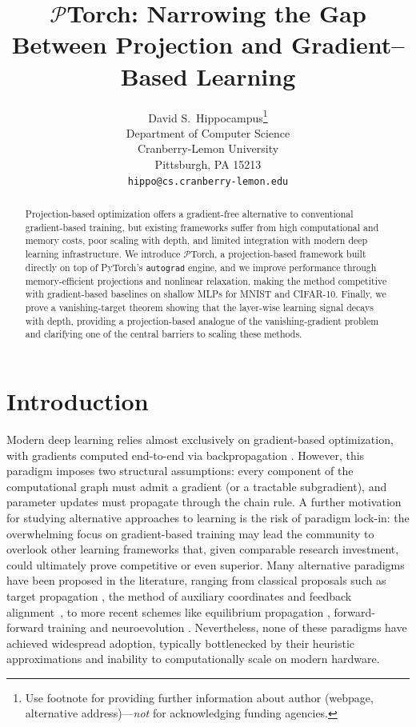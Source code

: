 \documentclass{article}
\title{$\mathcal{P}$Torch: Narrowing the Gap Between Projection and Gradient--Based Learning}
\author{%
  David S.~Hippocampus\thanks{Use footnote for providing further information
    about author (webpage, alternative address)---\emph{not} for acknowledging
    funding agencies.} \\
  Department of Computer Science\\
  Cranberry-Lemon University\\
  Pittsburgh, PA 15213 \\
  \texttt{hippo@cs.cranberry-lemon.edu} \\
}
\begin{document}
\maketitle

\begin{abstract}
Projection-based optimization offers a gradient-free alternative to conventional gradient-based training, but existing frameworks suffer from high computational and memory costs, poor scaling with depth, and limited integration with modern deep learning infrastructure. We introduce $\mathcal{P}$Torch, a projection-based framework built directly on top of PyTorch's \texttt{autograd} engine, and we improve performance through memory-efficient projections and nonlinear relaxation, making the method competitive with gradient-based baselines on shallow MLPs for MNIST and CIFAR-10. Finally, we prove a vanishing-target theorem showing that the layer-wise learning signal decays with depth, providing a projection-based analogue of the vanishing-gradient problem and clarifying one of the central barriers to scaling these methods.
\end{abstract}

\section{Introduction}
Modern deep learning relies almost exclusively on gradient-based optimization, with gradients computed end-to-end via backpropagation \cite{rumelhart1986learning}. However, this paradigm imposes two structural assumptions: every component of the computational graph must admit a gradient (or a tractable subgradient), and parameter updates must propagate through the chain rule. A further motivation for studying alternative approaches to learning is the risk of paradigm lock-in: the overwhelming focus on gradient-based training may lead the community to overlook other learning frameworks that, given comparable research investment, could ultimately prove competitive or even superior. Many alternative paradigms have been proposed in the literature, ranging from classical proposals such as target propagation \cite{lee2015difference}, the method of auxiliary coordinates \cite{carreira2014distributed} and feedback alignment~\cite{lillicrap2016random}, to more recent schemes like equilibrium propagation \cite{scellier2017equilibrium}, forward-forward training \cite{hinton2022forward} and neuroevolution \cite{such2017deep}. Nevertheless, none of these paradigms have achieved widespread adoption, typically bottlenecked by their heuristic approximations and inability to computationally scale on modern hardware.
\end{document}
